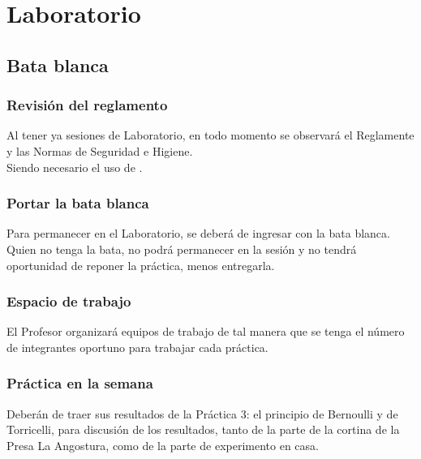\documentclass[14pt]{beamer}
\begin{document}
\section{Laboratorio}
\subsection{Bata blanca}

\begin{frame}
\frametitle{Revisión del reglamento}
Al tener ya sesiones de Laboratorio, en todo momento se observará el Reglamente y las Normas de Seguridad e Higiene.
\\
\bigskip
\pause
Siendo necesario el uso de .
\end{frame}
\begin{frame}
\frametitle{Portar la bata blanca}
Para permanecer en el Laboratorio, se deberá de ingresar con la bata blanca.
\\
\bigskip
\pause
Quien no tenga la bata, no podrá permanecer en la sesión y no tendrá oportunidad de reponer la práctica, menos entregarla.
\end{frame}
\begin{frame}
\frametitle{Espacio de trabajo}
El Profesor organizará equipos de trabajo de tal manera que se tenga el número de integrantes oportuno para trabajar cada práctica.
\end{frame}
\begin{frame}
\frametitle{Práctica en la semana}
Deberán de traer sus resultados de la Práctica 3: el principio de Bernoulli y de Torricelli, para discusión de los resultados, tanto de la parte de la cortina de la Presa La Angostura, como de la parte de experimento en casa.
\end{frame}
\end{document}
